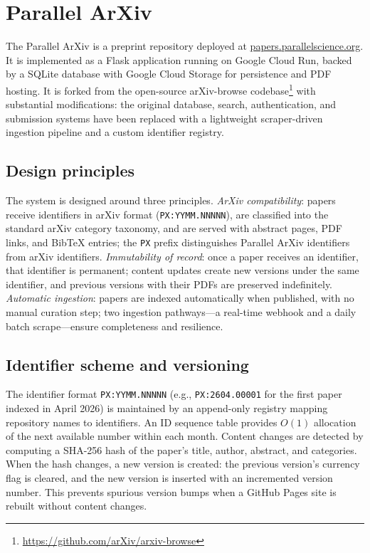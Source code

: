 \documentclass[11pt]{article}
\begin{document}
\section{Parallel ArXiv}
\label{sec:parallel_arxiv}

The Parallel ArXiv is a preprint repository deployed at \href{https://papers.parallelscience.org}{papers.parallelscience.org}. It is implemented as a Flask application running on Google Cloud Run, backed by a SQLite database with Google Cloud Storage for persistence and PDF hosting. It is forked from the open-source arXiv-browse codebase\footnote{\url{https://github.com/arXiv/arxiv-browse}} with substantial modifications: the original database, search, authentication, and submission systems have been replaced with a lightweight scraper-driven ingestion pipeline and a custom identifier registry.

\subsection{Design principles}

The system is designed around three principles. \emph{ArXiv compatibility}: papers receive identifiers in arXiv format (\texttt{PX:YYMM.NNNNN}), are classified into the standard arXiv category taxonomy, and are served with abstract pages, PDF links, and BibTeX entries; the \texttt{PX} prefix distinguishes Parallel ArXiv identifiers from arXiv identifiers. \emph{Immutability of record}: once a paper receives an identifier, that identifier is permanent; content updates create new versions under the same identifier, and previous versions with their PDFs are preserved indefinitely. \emph{Automatic ingestion}: papers are indexed automatically when published, with no manual curation step; two ingestion pathways---a real-time webhook and a daily batch scrape---ensure completeness and resilience.

\subsection{Identifier scheme and versioning}

The identifier format \texttt{PX:YYMM.NNNNN} (e.g., \texttt{PX:2604.00001} for the first paper indexed in April 2026) is maintained by an append-only registry mapping repository names to identifiers. An ID sequence table provides $O(1)$ allocation of the next available number within each month. Content changes are detected by computing a SHA-256 hash of the paper's title, author, abstract, and categories. When the hash changes, a new version is created: the previous version's currency flag is cleared, and the new version is inserted with an incremented version number. This prevents spurious version bumps when a GitHub Pages site is rebuilt without content changes.
\end{document}

